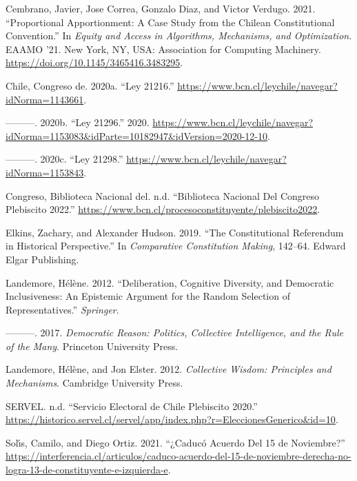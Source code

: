 \documentclass[
]{article}
\newlength{\cslhangindent}
\newlength{\cslentryspacingunit} %
\newenvironment{CSLReferences}[2] %
 {%
  \setlength{\parindent}{0pt}
  \ifodd #1
  \let\oldpar\par
  \def\par{\hangindent=\cslhangindent\oldpar}
  \fi
  \setlength{\parskip}{#2\cslentryspacingunit}
 }%
 {}
\begin{document}
\hypertarget{refs}{}
\begin{CSLReferences}{1}{0}
\leavevmode{}%
Cembrano, Javier, Jose Correa, Gonzalo Diaz, and Victor Verdugo. 2021.
{``Proportional Apportionment: A Case Study from the Chilean
Constitutional Convention.''} In \emph{Equity and Access in Algorithms,
Mechanisms, and Optimization}. EAAMO '21. New York, NY, USA: Association
for Computing Machinery. \url{https://doi.org/10.1145/3465416.3483295}.

\leavevmode{}%
Chile, Congreso de. 2020a. {``Ley 21216.''}
\url{https://www.bcn.cl/leychile/navegar?idNorma=1143661}.

\leavevmode{}%
---------. 2020b. {``Ley 21296.''} 2020.
\url{https://www.bcn.cl/leychile/navegar?idNorma=1153083\&idParte=10182947\&idVersion=2020-12-10}.

\leavevmode{}%
---------. 2020c. {``Ley 21298.''}
\url{https://www.bcn.cl/leychile/navegar?idNorma=1153843}.

\leavevmode{}%
Congreso, Biblioteca Nacional del. n.d. {``Biblioteca Nacional Del
Congreso Plebiscito 2022.''}
\url{https://www.bcn.cl/procesoconstituyente/plebiscito2022}.

\leavevmode{}%
Elkins, Zachary, and Alexander Hudson. 2019. {``The Constitutional
Referendum in Historical Perspective.''} In \emph{Comparative
Constitution Making}, 142--64. Edward Elgar Publishing.

\leavevmode{}%
Landemore, Hélène. 2012. {``Deliberation, Cognitive Diversity, and
Democratic Inclusiveness: An Epistemic Argument for the Random Selection
of Representatives.''} \emph{Springer}.

\leavevmode{}%
---------. 2017. \emph{Democratic Reason: Politics, Collective
Intelligence, and the Rule of the Many}. Princeton University Press.

\leavevmode{}%
Landemore, Hélène, and Jon Elster. 2012. \emph{Collective Wisdom:
Principles and Mechanisms}. Cambridge University Press.

\leavevmode{}%
SERVEL. n.d. {``Servicio Electoral de Chile Plebiscito 2020.''}
\url{https://historico.servel.cl/servel/app/index.php?r=EleccionesGenerico\&id=10}.

\leavevmode{}%
Solı́s, Camilo, and Diego Ortiz. 2021. {``¿Caduc{ó} Acuerdo Del 15 de
Noviembre?''}
\url{https://interferencia.cl/articulos/caduco-acuerdo-del-15-de-noviembre-derecha-no-logra-13-de-constituyente-e-izquierda-e}.

\end{CSLReferences}
\end{document}
